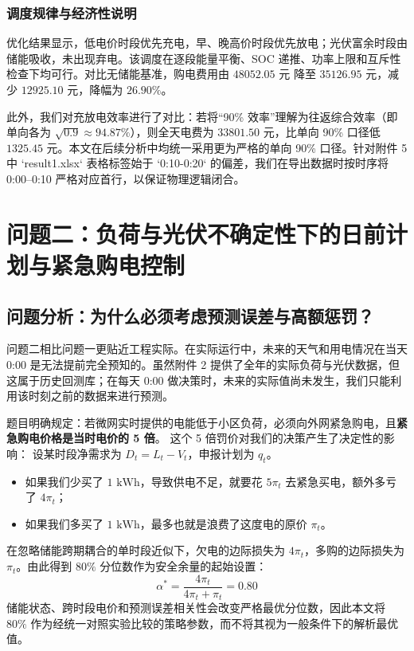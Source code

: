 \documentclass[withoutpreface]{cumcmthesis}
\begin{document}
\subsubsection{调度规律与经济性说明}
优化结果显示，低电价时段优先充电，早、晚高价时段优先放电；光伏富余时段由储能吸收，未出现弃电。该调度在逐段能量平衡、SOC 递推、功率上限和互斥性检查下均可行。对比无储能基准，购电费用由 $48052.05\text{ 元}$ 降至 $35126.95\text{ 元}$，减少 $12925.10\text{ 元}$，降幅为 $26.90\%$。

此外，我们对充放电效率进行了对比：若将“90\% 效率”理解为往返综合效率（即单向各为 $\sqrt{0.9} \approx 94.87\%$），则全天电费为 $33801.50\text{ 元}$，比单向 90\% 口径低 $1325.45\text{ 元}$。本文在后续分析中均统一采用更为严格的单向 90\% 口径。针对附件 5 中 `result1.xlsx` 表格标签始于 `0:10-0:20` 的偏差，我们在导出数据时按时序将 0:00--0:10 严格对应首行，以保证物理逻辑闭合。


\section{问题二：负荷与光伏不确定性下的日前计划与紧急购电控制}

\subsection{问题分析：为什么必须考虑预测误差与高额惩罚？}
问题二相比问题一更贴近工程实际。在实际运行中，未来的天气和用电情况在当天 0:00 是无法提前完全预知的。虽然附件 2 提供了全年的实际负荷与光伏数据，但这属于历史回测库；在每天 0:00 做决策时，未来的实际值尚未发生，我们只能利用该时刻之前的数据来进行预测。

题目明确规定：若微网实时提供的电能低于小区负荷，必须向外网紧急购电，且\textbf{紧急购电价格是当时电价的 5 倍}。
这个 5 倍罚价对我们的决策产生了决定性的影响：
设某时段净需求为 $D_t = L_t - V_t$，申报计划为 $q_t$。
\begin{itemize}
    \item 如果我们少买了 $1\text{ kWh}$，导致供电不足，就要花 $5\pi_t$ 去紧急买电，额外多亏了 $4\pi_t$；
    \item 如果我们多买了 $1\text{ kWh}$，最多也就是浪费了这度电的原价 $\pi_t$。
\end{itemize}
在忽略储能跨期耦合的单时段近似下，欠电的边际损失为 $4\pi_t$，多购的边际损失为 $\pi_t$。由此得到 $80\%$ 分位数作为安全余量的起始设置：
\begin{equation}
    \alpha^* = \frac{4\pi_t}{4\pi_t + \pi_t} = 0.80
\end{equation}
储能状态、跨时段电价和预测误差相关性会改变严格最优分位数，因此本文将 $80\%$ 作为经统一对照实验比较的策略参数，而不将其视为一般条件下的解析最优值。
\end{document}

